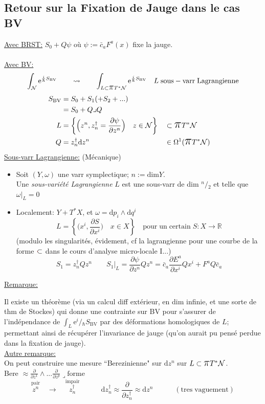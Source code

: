 \documentclass[a4paper,11pt]{article}
\renewcommand{\d}{{\mathrm{d}}}
\newcommand{\e}{{\mathrm{e}}}
\newcommand{\dr}[2]{\frac{\partial {#1}}{\partial{#2}}}
\newcommand{\ppi}{{\mathlarger{\mathlarger{\mathlarger{\pi}}}}}
\begin{document}
\subsection{Retour sur la Fixation de Jauge dans le cas BV}
\underline{Avec BRST:} \quad $S_0 + Q\psi$ où $\psi:=\bar c_a F^a(x)$ fixe la jauge.\\\\
\underline{Avec BV:}
$$\int_\mathcal{N} \e^{\frac i\hbar S_\mathrm{BV}} \quad\quad\rightsquigarrow\quad\quad
\int_{L\subset \ppi T^*\mathcal{N}} \e^{\frac i\hbar S_\mathrm{BV}} \quad L\; \mathrm{sous}-\mathrm{varr}\;\mathrm{Lagrangienne}$$
\begin{align*}
S_\mathrm{BV} &= S_0 + S_1 (+S_2 +...)\\
&= S_0 + Q \lrcorner Q\\
L &= \left\{\Big(z^n, z_n^\dag= \dr\psi{z^n}\Big) \quad z \in \mathcal{N} \right\} && \subset \ppi T^*\mathcal{N}\\
Q &= z_n^\dag\d z^n &&\in \Omega^1(\ppi T^*\mathcal N)
\end{align*}
\underline{Sous-varr Lagrangienne:} (Mécanique)
\begin{itemize}
\item Soit $(Y,\omega)$ une varr symplectique; $n:= \mathrm{dim} Y$.\\
Une \emph{sous-variété Lagrangienne} $L$ est une sous-varr de dim $^n\!/\!_2$ et telle que $\omega|_L=0$
\item Localement: $Y + T^* X$, et $\omega = \d p_i \wedge \d q^i$
$$L = \left\{\Big(x^i,\dr S{x^i}\Big)\quad x\in X\right\} \quad \mathrm{pour}\;\mathrm{un}\;\mathrm{certain}\; S:X\to\mathbb{R}$$
(modulo les singularités, évidement, cf la lagrangienne pour une courbe de la forme $\color{red}\cdot\color{black}\!\!\! \subset$ dans le cours d'analyse micro-locale I...)
$$S_1 = z_n^\dag Q z^n \quad\quad S_1|_L = \dr \psi{z^n} Q z^n = \bar c_a \dr{E^a}{x^i} Q x^i + F^aQ \bar c_a$$
\end{itemize}
\underline{Remarque:}

Il existe un théorème (via un calcul diff extérieur, en dim infinie, et une sorte de thm de Stockes) qui donne une contrainte sur BV pour s'assurer de l'indépendance de $\int_L \e{^i\!/\!_\hbar S_\mathrm{BV}}$ par des déformations homologiques de $L$; permettant ainsi de récupérer l'invariance de jauge (qu'on aurait pu pensé perdue dans la fixation de jauge).\\

\noindent\underline{Autre remarque:}\\
On peut construire une mesure ``Berezinienne" sur $\d z^n$ sur $L \subset \ppi T^*\mathcal{N}$.\\ 
Bere $\approx \dr{}{z^1}\wedge...\dr{}{z^p}\lrcorner \mathrm{forme}$
$$\overset{\mathrm{pair}}{z^n} \quad \longrightarrow\quad \overset{\mathrm{impair}}{z^\dag_n}\quad \quad \quad \d z^\dag_n\approx\dr{}{z_n^\dag}\approx\d z^n
\quad \quad \quad (\mathrm{tres}\;\mathrm{vaguement})$$
\end{document}
